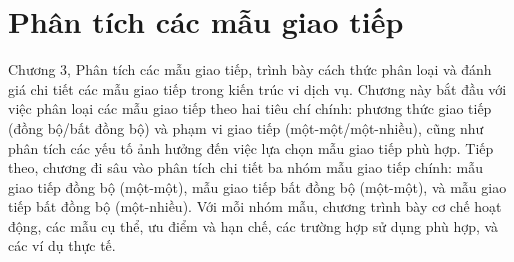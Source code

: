 \chapter{Phân tích các mẫu giao tiếp}

Chương 3, Phân tích các mẫu giao tiếp, trình bày cách thức phân loại và đánh giá chi tiết các mẫu giao tiếp trong kiến trúc vi dịch vụ. Chương này bắt đầu với việc phân loại các mẫu giao tiếp theo hai tiêu chí chính: phương thức giao tiếp (đồng bộ/bất đồng bộ) và phạm vi giao tiếp (một-một/một-nhiều), cũng như phân tích các yếu tố ảnh hưởng đến việc lựa chọn mẫu giao tiếp phù hợp. Tiếp theo, chương đi sâu vào phân tích chi tiết ba nhóm mẫu giao tiếp chính: mẫu giao tiếp đồng bộ (một-một), mẫu giao tiếp bất đồng bộ (một-một), và mẫu giao tiếp bất đồng bộ (một-nhiều). Với mỗi nhóm mẫu, chương trình bày cơ chế hoạt động, các mẫu cụ thể, ưu điểm và hạn chế, các trường hợp sử dụng phù hợp, và các ví dụ thực tế.





